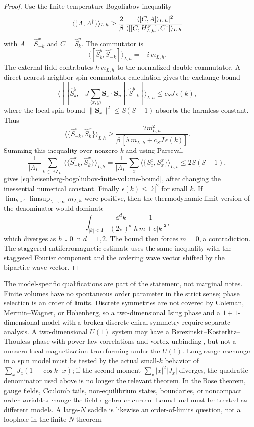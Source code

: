 \begin{proof}
Use the finite-temperature Bogoliubov inequality
\[
  \langle\{A,A^\dagger\}\rangle_{L,h}
  \ge
  \frac{2}{\beta}\,
  \frac{|\langle[C,A]\rangle_{L,h}|^2}
       {\langle[[C,H_{L,h}^{\rm F}],C^\dagger]\rangle_{L,h}}
\]
with \(A=\widehat S_{-k}^x\) and \(C=\widehat S_k^y\).  The commutator is
\[
  \langle[\widehat S_k^y,\widehat S_{-k}^x]\rangle_{L,h}
  =
  -i\,m_{L,h}.
\]
The external field contributes \(h\,m_{L,h}\) to the normalized double
commutator.  A direct nearest-neighbor spin-commutator calculation gives the
exchange bound
\[
  \langle[[\widehat S_k^y,-J\sum_{\langle x,y\rangle}
  \mathbf S_x\cdot\mathbf S_y],\widehat S_{-k}^y]\rangle_{L,h}
  \le
  c_SJ\,\epsilon(k),
\]
where the local spin bound \(\|\mathbf S_x\|^2\le S(S+1)\) absorbs the harmless
constant.  Thus
\begin{equation}
  \langle\{\widehat S_{-k}^x,\widehat S_k^x\}\rangle_{L,h}
  \ge
  \frac{2m_{L,h}^2}
       {\beta\,[h\,m_{L,h}+c_SJ\,\epsilon(k)]}.
  \label{eq:heisenberg-mode-bogoliubov-lower-bound}
\end{equation}
Summing this inequality over nonzero \(k\) and using Parseval,
\[
  \frac1{|\Lambda_L|}\sum_{k\in\operatorname{BZ}_L}
  \langle\{\widehat S_{-k}^x,\widehat S_k^x\}\rangle_{L,h}
  =
  \frac1{|\Lambda_L|}\sum_x
  \langle\{S_x^x,S_x^x\}\rangle_{L,h}
  \le
  2S(S+1),
\]
gives \eqref{eq:heisenberg-bogoliubov-finite-volume-bound}, after changing
the inessential numerical constant.  Finally
\(\epsilon(k)\le |k|^2\) for small \(k\).  If
\(\lim_{h\downarrow0}\limsup_{L\to\infty}m_{L,h}\) were positive, then the
thermodynamic-limit version of the denominator would dominate
\[
  \int_{|k|<\Lambda}\frac{\dd^dk}{(2\pi)^d}\,
  \frac{1}{h\,m+c|k|^2},
\]
which diverges as \(h\downarrow0\) in \(d=1,2\).  The bound then forces
\(m=0\), a contradiction.  The staggered antiferromagnetic estimate uses the
same inequality with the staggered Fourier component and the ordering wave
vector shifted by the bipartite wave vector.
\end{proof}

The model-specific qualifications are part of the statement, not marginal
notes.  Finite volumes have no spontaneous order parameter in the strict
sense; phase selection is an order of limits.  Discrete symmetries are not
covered by Coleman, Mermin--Wagner, or Hohenberg, so a two-dimensional Ising
phase and a \(1+1\)-dimensional model with a broken discrete chiral symmetry
require separate analysis.  A two-dimensional \(U(1)\) system may have a
Berezinskii--Kosterlitz--Thouless phase with power-law correlations and vortex
unbinding \cite{Berezinskii1971,KosterlitzThouless1973}, but not a nonzero
local magnetization transforming under the \(U(1)\).  Long-range exchange in a
spin model must be tested by the actual small-\(k\) behavior of
\(\sum_x J_x(1-\cos k\cdot x)\); if the second moment
\(\sum_x |x|^2|J_x|\) diverges, the quadratic denominator used above is no
longer the relevant theorem.  In the Bose theorem, gauge fields, Coulomb tails,
non-equilibrium states, boundaries, or noncompact order variables change the
field algebra or current bound and must be treated as different models.  A
large-\(N\) saddle is likewise an order-of-limits question, not a loophole in
the finite-\(N\) theorem.

